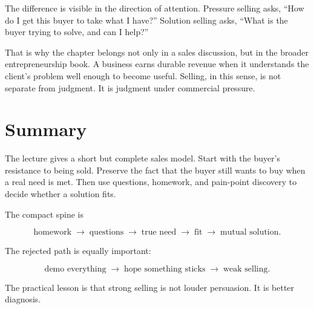 The difference is visible in the direction of attention. Pressure selling asks, ``How do I get this buyer to take what I have?'' Solution selling asks, ``What is the buyer trying to solve, and can I help?''

That is why the chapter belongs not only in a sales discussion, but in the broader entrepreneurship book. A business earns durable revenue when it understands the client's problem well enough to become useful. Selling, in this sense, is not separate from judgment. It is judgment under commercial pressure.

\section{Summary}

The lecture gives a short but complete sales model. Start with the buyer's resistance to being sold. Preserve the fact that the buyer still wants to buy when a real need is met. Then use questions, homework, and pain-point discovery to decide whether a solution fits.

The compact spine is

\begin{equation}
\text{homework}
\;\longrightarrow\;
\text{questions}
\;\longrightarrow\;
\text{true need}
\;\longrightarrow\;
\text{fit}
\;\longrightarrow\;
\text{mutual solution}.
\end{equation}

The rejected path is equally important:

\begin{equation}
\text{demo everything}
\;\longrightarrow\;
\text{hope something sticks}
\;\longrightarrow\;
\text{weak selling}.
\end{equation}

The practical lesson is that strong selling is not louder persuasion. It is better diagnosis.